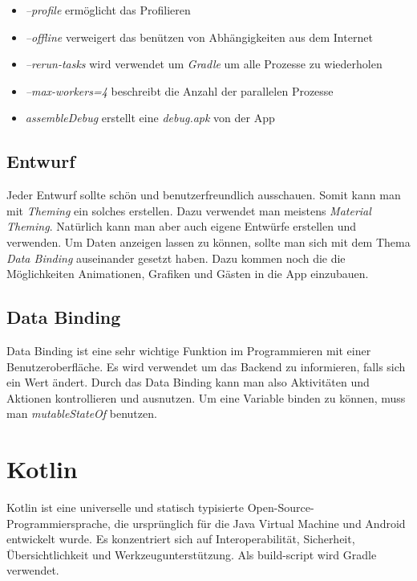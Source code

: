 \begin{itemize}
    \item \textit{--profile} ermöglicht das Profilieren
    \item \textit{--offline} verweigert das benützen von Abhängigkeiten aus dem Internet
    \item \textit{--rerun-tasks} wird verwendet um \textit{Gradle} um alle Prozesse zu wiederholen
    \item \textit{--max-workers=4} beschreibt die Anzahl der parallelen Prozesse \cite{Gradle-Max-Worker}
    \item \textit{assembleDebug} erstellt eine \textit{debug.apk} von der App
\end{itemize}


\subsection{Entwurf}
Jeder Entwurf sollte schön und benutzerfreundlich ausschauen. Somit kann man mit \textit{Theming} ein solches erstellen.
Dazu verwendet man meistens \textit{Material Theming}. Natürlich kann man aber auch eigene Entwürfe erstellen und verwenden.
Um Daten anzeigen lassen zu können, sollte man sich mit dem Thema \textit{Data Binding} auseinander gesetzt haben.
Dazu kommen noch die die Möglichkeiten Animationen, Grafiken und Gästen in die App einzubauen.


\subsection{Data Binding}
Data Binding ist eine sehr wichtige Funktion im Programmieren mit einer Benutzeroberfläche. Es wird verwendet um das Backend 
zu informieren, falls sich ein Wert ändert. Durch das Data Binding kann man also Aktivitäten und Aktionen kontrollieren und ausnutzen.
Um eine Variable binden zu können, muss man \textit{mutableStateOf} benutzen. 


\pagebreak
\section{Kotlin}
\cite{Kotlin1}
\cite{Kotlin2}
\author{Bozidar Spasenovic}
Kotlin ist eine universelle und statisch typisierte Open-Source-Programmiersprache, die ursprünglich für die Java Virtual Machine und Android entwickelt wurde.
Es konzentriert sich auf Interoperabilität, Sicherheit, Übersichtlichkeit und Werkzeugunterstützung. Als build-script wird Gradle verwendet.

